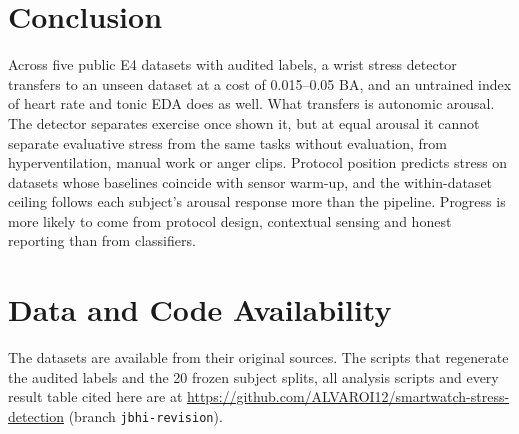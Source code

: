 \documentclass[journal]{IEEEtran}
\begin{document}
\section{Conclusion}
Across five public E4 datasets with audited labels, a wrist stress detector transfers to an unseen dataset at a cost of 0.015--0.05 BA, and an untrained index of heart rate and tonic EDA does as well. What transfers is autonomic arousal. The detector separates exercise once shown it, but at equal arousal it cannot separate evaluative stress from the same tasks without evaluation, from hyperventilation, manual work or anger clips. Protocol position predicts stress on datasets whose baselines coincide with sensor warm-up, and the within-dataset ceiling follows each subject's arousal response more than the pipeline. Progress is more likely to come from protocol design, contextual sensing and honest reporting than from classifiers.

\section*{Data and Code Availability}
The datasets are available from their original sources. The scripts that regenerate the audited labels and the 20 frozen subject splits, all analysis scripts and every result table cited here are at \url{https://github.com/ALVAROI12/smartwatch-stress-detection} (branch \texttt{jbhi-revision}).
\end{document}
